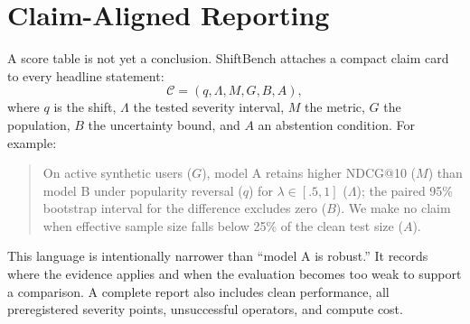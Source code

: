 \section{Claim-Aligned Reporting}
\label{sec:claims}

A score table is not yet a conclusion.  ShiftBench attaches a compact claim card
to every headline statement:
\begin{equation*}
  \mathcal{C}=(q,\Lambda,M,G,B,A),
\end{equation*}
where $q$ is the shift, $\Lambda$ the tested severity interval, $M$ the metric,
$G$ the population, $B$ the uncertainty bound, and $A$ an abstention condition.
For example:

\begin{quote}\small
On active synthetic users ($G$), model A retains higher NDCG@10 ($M$) than model
B under popularity reversal ($q$) for $\lambda\in[.5,1]$ ($\Lambda$); the paired
95\% bootstrap interval for the difference excludes zero ($B$).  We make no
claim when effective sample size falls below 25\% of the clean test size ($A$).
\end{quote}

This language is intentionally narrower than ``model A is robust.''  It records
where the evidence applies and when the evaluation becomes too weak to support a
comparison.  A complete report also includes clean performance, all preregistered
severity points, unsuccessful operators, and compute cost.
